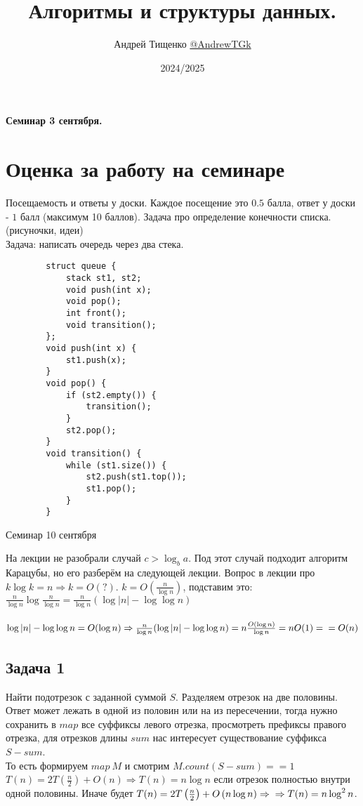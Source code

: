 \documentclass[12pt, a4paper]{article}
\title{Алгоритмы и структуры данных.}
\author{Андрей Тищенко \href{https://t.me/AndrewTGk}{@AndrewTGk}}
\date{2024/2025}
\begin{document}
    \maketitle
    \begin{center}
        \textbf{Семинар 3 сентября.}
    \end{center}
    \section*{Оценка за работу на семинаре}
    Посещаемость и ответы у доски. Каждое посещение это $0.5$ балла, ответ у доски - $1$ балл (максимум 10 баллов).
    Задача про определение конечности списка. (рисуночки, идеи)\\
    Задача: написать очередь через два стека.
    \begin{lstlisting}
        struct queue {
            stack st1, st2;
            void push(int x);
            void pop();
            int front();
            void transition();
        };
        void push(int x) {
            st1.push(x);
        }
        void pop() {
            if (st2.empty()) {
                transition();
            }
            st2.pop();
        }
        void transition() {
            while (st1.size()) {
                st2.push(st1.top());
                st1.pop();
            }
        }
    \end{lstlisting}
    \begin{center}
        Семинар 10 сентября
    \end{center}
    На лекции не разобрали случай $c > \log_b a$. Под этот случай подходит алгоритм Карацубы, но его 
    разберём на следующей лекции.
    Вопрос в лекции про $k\log k = n\Rightarrow k = O(?)$. $k = O\left(\frac{n}{\log n}\right)$, подставим это:\\
    $\frac{n}{\log n} \log \frac{n}{\log n} = \frac{n}{\log n}(\log |n| - \log\log n)$\\\
    $\log |n| - \log\log n = O(\log n)\Rightarrow \frac{n}{\log n}(\log |n| - \log\log n) = n\frac{O(\log n)}{\log n} = nO(1) =\\
    = O(n)$
    \subsection*{Задача 1}
    Найти подотрезок с заданной суммой $S$. Разделяем отрезок на две половины.\\
    Ответ может лежать в одной из половин или на из пересечении, тогда нужно сохранить в 
    $map$ все суффиксы левого отрезка, просмотреть префиксы правого отрезка, для отрезков длины $sum$
    нас интересует существование суффикса $S - sum$.\\
    То есть формируем $map\ M$ и смотрим $M.count(S - sum) == 1$\\
    $T(n) = 2T\left(\frac{n}{2} \right) + O\left(n\right)\Rightarrow T(n) = n\log n$ если отрезок полностью внутри одной половины.
    Иначе будет $T(n) = 2T\left(\frac{n}{2} \right) + O\left(n\log n\right)\Rightarrow\\
    \Rightarrow  T(n) = n\log^2 n$.
\end{document}

